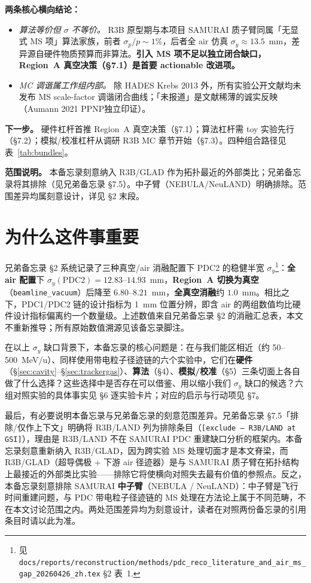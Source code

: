 \documentclass[a4paper, 11pt]{article}
\begin{document}
\textbf{两条核心横向结论：}
\begin{itemize}[leftmargin=2em,itemsep=0pt]
\item \emph{算法等价但 $\sigma$ 不等价。} R3B 原型期与本项目 SAMURAI 质子臂同属「无显式 MS 项」算法家族，前者 $\sigma_p/p \sim 1\%$，后者全 air 仿真 $\sigma_y \approx 13.5$~mm，差异源自硬件物质预算而非算法。\textbf{引入 MS 项不足以独立闭合缺口，Region~A 真空决策（§7.1）是首要 actionable 改进项。}
\item \emph{MC 调谐属工作组内部。} 除 HADES Krebs 2013 外，所有实验公开文献均未发布 MS scale-factor 调谐闭合曲线；「未报道」是文献稀薄的诚实反映（Aumann 2021 PPNP独立印证）。
\end{itemize}

\textbf{下一步。} 硬件杠杆首推 Region~A 真空决策（§7.1）；算法杠杆需 toy 实验先行（§7.2）；模拟/校准杠杆从调研 R3B MC 章节开始（§7.3）。四种组合路径见表~\ref{tab:bundles}。

\textbf{范围说明。} 本备忘录刻意纳入 R3B/GLAD 作为拓扑最近的外部类比；兄弟备忘录将其排除（见兄弟备忘录 §7.5）。中子臂（NEBULA/NeuLAND）明确排除。范围差异均属刻意设计，详见 §2 末段。

\section{为什么这件事重要}

兄弟备忘录 §2 系统记录了三种真空/air 消融配置下 PDC2 的稳健半宽 $\sigma_y$\footnote{\label{fn:sibling_sec2}见 \texttt{docs/reports/reconstruction/methods/pdc\_reco\_literature\_and\_air\_ms\_gap\_20260426\_zh.tex} §2 表~1.}：\textbf{全 air 配置}下 $\sigma_y(\text{PDC2}) = 12.83$--$14.93$~mm，\textbf{Region~A 切换为真空}（\texttt{beamline\_vacuum}）后降至 $6.80$--$8.21$~mm，\textbf{全真空消融}约 $1.0$~mm。相比之下，PDC1/PDC2 链的设计指标为 1~mm 位置分辨，即含 air 的两组数值均比硬件设计指标偏离约一个数量级。上述数值来自兄弟备忘录 §2 的消融汇总表，本文不重新推导；所有原始数值溯源见该备忘录脚注。

在以上 $\sigma_y$ 缺口背景下，本备忘录的核心问题是：在与我们能区相近（约 50--500~MeV/u）、同样使用带电粒子径迹链的六个实验中，它们在\textbf{硬件}（§\ref{sec:cavity}--§\ref{sec:trackergas}）、\textbf{算法}（§4）、\textbf{模拟/校准}（§5）三条切面上各自做了什么选择？这些选择中是否存在可以借鉴、用以缩小我们 $\sigma_y$ 缺口的候选？六组对照实验的具体事实见 §6 逐实验卡片；对应的启示与行动项见 §7。

最后，有必要说明本备忘录与兄弟备忘录的刻意范围差异。兄弟备忘录 §7.5「排除/仅作上下文」明确将 R3B/LAND 列为排除条目（\texttt{[exclude --- R3B/LAND at GSI]}），理由是 R3B/LAND 不在 SAMURAI PDC 重建缺口分析的框架内。本备忘录刻意重新纳入 R3B/GLAD，因为跨实验 MS 处理切面才是本文脊梁，而 R3B/GLAD（超导偶极 + 下游 air 径迹器）是与 SAMURAI 质子臂在拓扑结构上最接近的外部类比实验——排除它将使横向对照失去最有价值的参照点。反之，本备忘录刻意排除 SAMURAI \textbf{中子臂}（NEBULA / NeuLAND）：中子臂是飞行时间重建问题，与 PDC 带电粒子径迹链的 MS 处理在方法论上属于不同范畴，不在本文讨论范围之内。两处范围差异均为刻意设计，读者在对照两份备忘录的引用条目时请以此为准。
\end{document}
